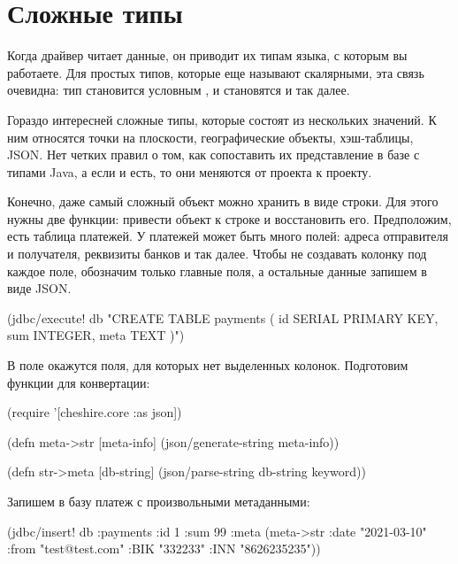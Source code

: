 \section{Сложные типы}

Когда драйвер читает данные, он приводит их типам языка, с которым вы работаете. Для простых типов, которые еще называют скалярными, эта связь очевидна: тип  становится условным ,  и  становятся  и так далее.

Гораздо интересней сложные типы, которые состоят из нескольких значений. К ним относятся точки на плоскости, географические объекты, хэш-таблицы, JSON. Нет четких правил о том, как сопоставить их представление в базе с типами Java, а если и есть, то они меняются от проекта к проекту.

Конечно, даже самый сложный объект можно хранить в виде строки. Для этого нужны две функции: привести объект к строке и восстановить его. Предположим, есть таблица платежей. У платежей может быть много полей: адреса отправителя и получателя, реквизиты банков и так далее. Чтобы не создавать колонку под каждое поле, обозначим только главные поля, а остальные данные запишем в виде JSON.

\begin{english}
  \begin{clojure}
(jdbc/execute! db "CREATE TABLE payments (
  id SERIAL PRIMARY KEY,
  sum INTEGER,
  meta TEXT
)")
  \end{clojure}
\end{english}

В поле  окажутся поля, для которых нет выделенных колонок. Подготовим функции для конвертации:

\begin{english}
  \begin{clojure}
(require '[cheshire.core :as json])

(defn meta->str [meta-info]
  (json/generate-string meta-info))

(defn str->meta [db-string]
  (json/parse-string db-string keyword))
  \end{clojure}
\end{english}

Запишем в базу платеж с произвольными метаданными:

\begin{english}
  \begin{clojure}
(jdbc/insert!
 db :payments
 {:id 1
  :sum 99
  :meta (meta->str {:date "2021-03-10"
                    :from "test@test.com"
                    :BIK "332233"
                    :INN "8626235235"})})
  \end{clojure}
\end{english}

